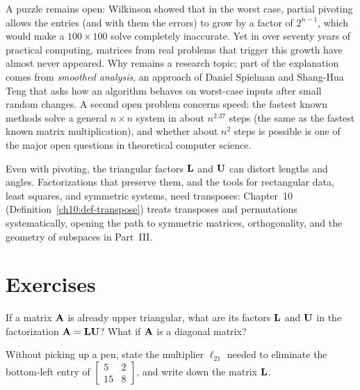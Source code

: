 \begin{historybox}
A puzzle remains open: Wilkinson showed that in the worst case, partial pivoting allows the entries (and
with them the errors) to grow by a factor of $2^{n-1}$, which would make a $100\times 100$ solve
completely inaccurate. Yet in over seventy years of practical computing, matrices from real problems that
trigger this growth have almost never appeared. Why remains a research topic; part of the explanation comes
from \emph{smoothed analysis}, an approach of Daniel Spielman and Shang-Hua Teng that asks how an algorithm
behaves on worst-case inputs after small random changes. A second open problem concerns speed: the fastest
known methods solve a general $n\times n$ system in about $n^{2.37}$ steps (the same as the fastest known
matrix multiplication), and whether about $n^2$ steps is possible is one of the major open questions in
theoretical computer science.

Even with pivoting, the triangular factors $\mathbf{L}$ and $\mathbf{U}$ can distort lengths and angles. Factorizations
that preserve them, and the tools for rectangular data, least squares, and symmetric systems, need transposes:
Chapter~10 (Definition~\ref{ch10:def-transpose}) treats transposes and permutations systematically, opening the
path to symmetric matrices, orthogonality, and the geometry of subspaces in Part~III.
\end{historybox}

\section{Exercises}
\label{ch09:exercises}

\begin{exercise}
\label{ch09:ex-mental-tri}
If a matrix $\mathbf{A}$ is already upper triangular, what are its factors $\mathbf{L}$ and $\mathbf{U}$ in the factorization $\mathbf{A}=\mathbf{L}\mathbf{U}$? What if $\mathbf{A}$ is a diagonal matrix?
\end{exercise}

\begin{exercise}
\label{ch09:ex-mental-multipliers}
Without picking up a pen, state the multiplier $\ell_{21}$ needed to eliminate the bottom-left entry of $\begin{bmatrix}5 & 2 \\ 15 & 8\end{bmatrix}$, and write down the matrix $\mathbf{L}$.
\end{exercise}

